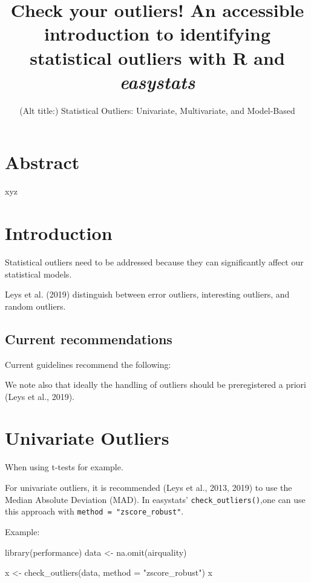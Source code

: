 \documentclass[
]{article}
\title{Check your outliers! An accessible introduction to identifying
statistical outliers with R and \emph{easystats}}
\subtitle{(Alt title:) Statistical Outliers: Univariate, Multivariate,
and Model-Based}
\author{}
\date{\vspace{-2.5em}}
\newenvironment{Shaded}{\begin{snugshade}}{\end{snugshade}}
\newcommand{\AttributeTok}[1]{\textcolor[rgb]{0.77,0.63,0.00}{#1}}
\newcommand{\FunctionTok}[1]{\textcolor[rgb]{0.00,0.00,0.00}{#1}}
\newcommand{\NormalTok}[1]{#1}
\newcommand{\OtherTok}[1]{\textcolor[rgb]{0.56,0.35,0.01}{#1}}
\newcommand{\StringTok}[1]{\textcolor[rgb]{0.31,0.60,0.02}{#1}}
\begin{document}
\maketitle

\hypertarget{abstract}{%
\section{Abstract}\label{abstract}}

xyz

\hypertarget{introduction}{%
\section{Introduction}\label{introduction}}

Statistical outliers need to be addressed because they can significantly
affect our statistical models.

Leys et al. (2019) distinguish between error outliers, interesting
outliers, and random outliers.

\hypertarget{current-recommendations}{%
\subsection{Current recommendations}\label{current-recommendations}}

Current guidelines recommend the following:

We note also that ideally the handling of outliers should be
preregistered a priori (Leys et al., 2019).

\hypertarget{univariate-outliers}{%
\section{Univariate Outliers}\label{univariate-outliers}}

When using t-tests for example.

For univariate outliers, it is recommended (Leys et al., 2013, 2019) to
use the Median Absolute Deviation (MAD). In easystats'
\texttt{check\_outliers()},one can use this approach with
\texttt{method\ =\ "zscore\_robust"}.

Example:

\begin{Shaded}
\begin{Highlighting}[]
\FunctionTok{library}\NormalTok{(performance)}
\NormalTok{data }\OtherTok{\textless{}{-}} \FunctionTok{na.omit}\NormalTok{(airquality)}

\NormalTok{x }\OtherTok{\textless{}{-}} \FunctionTok{check\_outliers}\NormalTok{(data, }\AttributeTok{method =} \StringTok{"zscore\_robust"}\NormalTok{)}
\NormalTok{x}
\end{Highlighting}
\end{Shaded}
\end{document}
